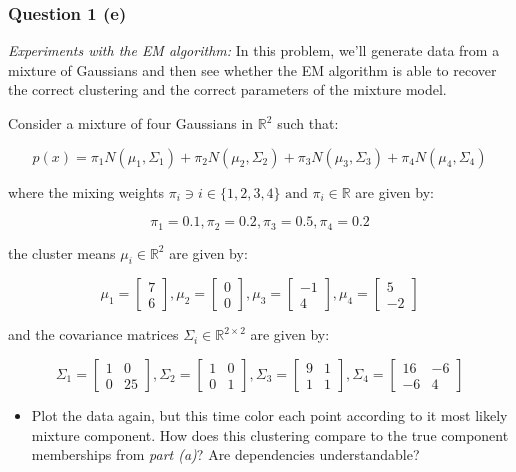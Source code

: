 \documentclass{article}
\begin{document}
\subsubsection*{Question 1 (e)}
\begin{flushleft}
\textit{Experiments with the EM algorithm:} In this problem, we'll generate data from a mixture of Gaussians and then see whether the EM algorithm is able to recover the correct clustering and the correct parameters of the mixture model.
\end{flushleft}
\begin{flushleft}
    Consider a mixture of four Gaussians in $\mathbb{R}^2$ such that:
\end{flushleft}
$$p(x) = \pi_1 N(\mu_1, \Sigma_1) + \pi_2 N(\mu_2, \Sigma_2) + \pi_3 N(\mu_3, \Sigma_3) + \pi_4 N(\mu_4, \Sigma_4)$$
\begin{flushleft}
    where the mixing weights $\pi_i \ni i \in \{1,2,3,4\} \text{ and } \pi_i \in \mathbb{R}$ are given by:
\end{flushleft}
$$\pi_1 = 0.1, \pi_2 = 0.2, \pi_3 = 0.5, \pi_4 = 0.2$$
\begin{flushleft}
    the cluster means $\mu_i \in \mathbb{R}^2$ are given by:
\end{flushleft}
$$\mu_1 = \begin{bmatrix}7 \\ 6\end{bmatrix}, \mu_2 = \begin{bmatrix}0 \\ 0\end{bmatrix}, \mu_3 = \begin{bmatrix}-1 \\ 4\end{bmatrix}, \mu_4 = \begin{bmatrix}5 \\ -2\end{bmatrix}$$
\begin{flushleft}
    and the covariance matrices $\Sigma_i \in \mathbb{R}^{2 \times 2}$ are given by:
\end{flushleft}
$$\Sigma_1 = \begin{bmatrix}1 & 0 \\ 0 & 25\end{bmatrix}, \Sigma_2 = \begin{bmatrix}1 & 0 \\ 0 & 1\end{bmatrix}, \Sigma_3 = \begin{bmatrix}9 & 1 \\ 1 & 1\end{bmatrix}, \Sigma_4 = \begin{bmatrix}16 & -6 \\ -6 & 4\end{bmatrix}$$
\begin{itemize}
    \item Plot the data again, but this time color each point according to it most likely mixture component. How does this clustering compare to the true component memberships from \textit{part (a)}? Are dependencies understandable?
\end{itemize}
\end{document}
